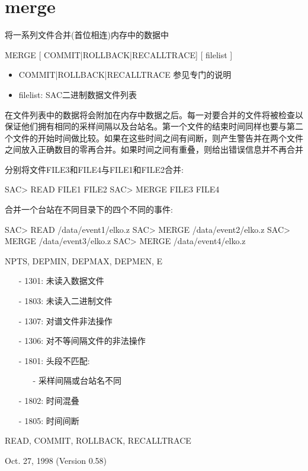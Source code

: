 \section{merge}
\label{cmd:merge}

将一系列文件合并(首位相连)内存中的数据中

MERGE [ COMMIT|ROLLBACK|RECALLTRACE] [ filelist ]

\begin{itemize}
\item COMMIT|ROLLBACK|RECALLTRACE 参见专门的说明
\item filelist: SAC二进制数据文件列表
\end{itemize}

在文件列表中的数据将会附加在内存中数据之后。每一对要合并的文件将被检查以保证他们拥有相同的采样间隔以及台站名。第一个文件的结束时间同样也要与第二个文件的开始时间做比较。如果在这些时间之间有间断，则产生警告并在两个文件之间放入正确数目的零再合并。如果时间之间有重叠，则给出错误信息并不再合并

分别将文件FILE3和FILE4与FILE1和FILE2合并:
\begin{SACCode}
SAC> READ FILE1 FILE2
SAC> MERGE FILE3 FILE4
\end{SACCode}
合并一个台站在不同目录下的四个不同的事件:
\begin{SACCode}
SAC> READ /data/event1/elko.z
SAC> MERGE /data/event2/elko.z
SAC> MERGE /data/event3/elko.z
SAC> MERGE /data/event4/elko.z
\end{SACCode}

NPTS, DEPMIN, DEPMAX, DEPMEN, E

\begin{itemize}
\item[-]1301: 未读入数据文件
\item[-]1803: 未读入二进制文件
\item[-]1307: 对谱文件非法操作
\item[-]1306: 对不等间隔文件的非法操作
\item[-]1801: 头段不匹配:
	\begin{itemize}
	\item[-]采样间隔或台站名不同
	\end{itemize}
\item[-]1802: 时间混叠
\end{itemize}

\begin{itemize}
\item[-]1805: 时间间断
\end{itemize}

READ, COMMIT, ROLLBACK, RECALLTRACE

Oct. 27, 1998 (Version 0.58)
